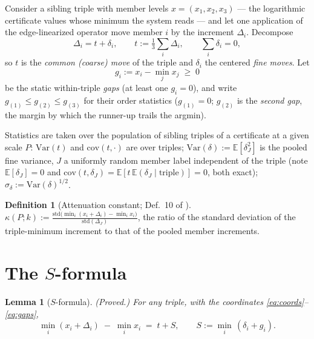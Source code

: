 \documentclass[11pt]{article}
\newtheorem{lemma}[theorem]{Lemma}
\theoremstyle{definition}
\newtheorem{definition}[theorem]{Definition}
\theoremstyle{remark}
\newcommand{\E}{\mathbb{E}}
\newcommand{\Var}{\mathrm{Var}}
\newcommand{\cov}{\mathrm{cov}}
\newcommand{\kap}{\kappa}
\newcommand{\dl}{\delta}
\begin{document}
Consider a sibling triple with member levels $x = (x_1, x_2, x_3)$ ---
the logarithmic certificate values whose minimum the system reads ---
and let one application of the edge-linearized operator move member $i$
by the increment $\Delta_i$. Decompose
\begin{equation}
\Delta_i = t + \dl_i, \qquad
t := \tfrac13 \textstyle\sum_i \Delta_i, \qquad
\textstyle\sum_i \dl_i = 0,
\label{eq:coords}
\end{equation}
so $t$ is the \emph{common (coarse) move} of the triple and $\dl_i$ the
centered \emph{fine moves}. Let
\begin{equation}
g_i := x_i - \min_j x_j \;\geq\; 0
\label{eq:gaps}
\end{equation}
be the static within-triple \emph{gaps} (at least one $g_i = 0$), and
write $g_{(1)} \leq g_{(2)} \leq g_{(3)}$ for their order statistics
($g_{(1)} = 0$; $g_{(2)}$ is the \emph{second gap}, the margin by which
the runner-up trails the argmin).

Statistics are taken over the population of sibling triples of a
certificate at a given scale $P$: $\Var(t)$ and $\cov(t, \cdot)$ are over
triples; $\Var(\dl) := \E[\dl_J^2]$ is the pooled fine variance, $J$ a
uniformly random member label independent of the triple (note
$\E[\dl_J] = 0$ and $\cov(t, \dl_J) = \E[t \,\E(\dl_J \mid
\mathrm{triple})] = 0$, both exact); $\sigma_\dl := \Var(\dl)^{1/2}$.

\begin{definition}[Attenuation constant; Def.~10 of \cite{Drift26}]
\label{def:kappa}
$\displaystyle \kap(P;k) := \frac{\mathrm{std}\big(\min_i (x_i + \Delta_i)
- \min_i x_i\big)}{\mathrm{std}(\Delta_J)}$,
the ratio of the standard deviation of the triple-minimum increment to
that of the pooled member increments.
\end{definition}

\section{The $S$-formula}
\label{sec:S}

\begin{lemma}[$S$-formula]
\label{lem:S}
\textup{(Proved.)}
For any triple, with the coordinates \eqref{eq:coords}--\eqref{eq:gaps},
\begin{equation}
\min_i (x_i + \Delta_i) \;-\; \min_i x_i \;=\; t + S,
\qquad
S := \min_i \,(\dl_i + g_i).
\label{eq:S}
\end{equation}
\end{lemma}
\end{document}
